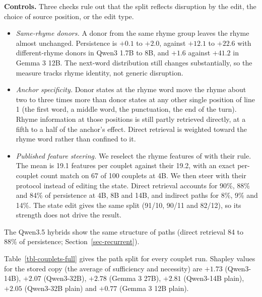 \documentclass[
]{article}
\providecommand{\tightlist}{%
  \setlength{\itemsep}{0pt}\setlength{\parskip}{0pt}}
\begin{document}
\textbf{Controls.} Three checks rule out that the split reflects
disruption by the edit, the choice of source position, or the edit type.

\begin{itemize}
\tightlist
\item
  \emph{Same-rhyme donors.} A donor from the same rhyme group leaves the
  rhyme almost unchanged. Persistence is \(+0.1\) to \(+2.0\), against
  \(+12.1\) to \(+22.6\) with different-rhyme donors in Qwen3 1.7B to
  8B, and \(+1.6\) against \(+41.2\) in Gemma 3 12B. The next-word
  distribution still changes substantially, so the measure tracks rhyme
  identity, not generic disruption.
\item
  \emph{Anchor specificity.} Donor states at the rhyme word move the
  rhyme about two to three times more than donor states at any other
  single position of line 1 (the first word, a middle word, the
  punctuation, the end of the turn). Rhyme information at those
  positions is still partly retrieved directly, at a fifth to a half of
  the anchor's effect. Direct retrieval is weighted toward the rhyme
  word rather than confined to it.
\item
  \emph{Published feature steering.} We reselect the rhyme features of
  \citet{hanna2026latent} with their rule. The mean is 19.1 features per
  couplet against their 19.2, with an exact per-couplet count match on
  67 of 100 couplets at 4B. We then steer with their protocol instead of
  editing the state. Direct retrieval accounts for 90\%, 88\% and 84\%
  of persistence at 4B, 8B and 14B, and indirect paths for 8\%, 9\% and
  14\%. The state edit gives the same split (91/10, 90/11 and 82/12), so
  its strength does not drive the result.
\end{itemize}

The Qwen3.5 hybrids show the same structure of paths (direct retrieval
84 to 88\% of persistence; Section~\ref{sec-recurrent}).

Table~\ref{tbl-couplets-full} gives the path split for every couplet
run. Shapley values for the stored copy (the average of sufficiency and
necessity) are \(+1.73\) (Qwen3-14B), \(+2.07\) (Qwen3-32B), \(+2.78\)
(Gemma 3 27B), \(+2.81\) (Qwen3-14B plain), \(+2.05\) (Qwen3-32B plain)
and \(+0.77\) (Gemma 3 12B plain).
\end{document}
